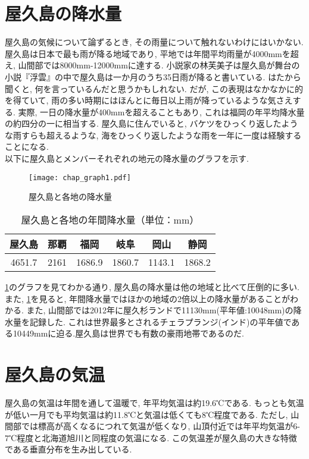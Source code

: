 \documentclass[10pt,titlepage,a5paper]{ltjsbook}
\begin{document}
  \section{屋久島の降水量}
    屋久島の気候について論ずるとき, その雨量について触れないわけにはいかない. 屋久島は日本で最も雨が降る地域であり, 平地では年間平均雨量が4000mmを超え, 山間部では8000mm-12000mmに達する.
    小説家の林芙美子は屋久島が舞台の小説『浮雲』の中で屋久島は一か月のうち35日雨が降ると書いている. はたから聞くと, 何を言っているんだと思うかもしれない. だが, この表現はなかなかに的を得ていて, 雨の多い時期にはほんとに毎日以上雨が降っているような気さえする. 
    実際, 一日の降水量が400mmを超えることもあり, これは福岡の年平均降水量の約四分の一に相当する. 屋久島に住んでいると, バケツをひっくり返したような雨すらも超えるような, 
    海をひっくり返したような雨を一年に一度は経験することになる. \\
    以下に屋久島とメンバーそれぞれの地元の降水量のグラフを示す.
    \begin{figure}[H]
      \centering
      \texttt{[image: chap\_graph1.pdf]}
      \caption{屋久島と各地の降水量}
      \label{fig:yakushima_precipitation}
    \end{figure}
    \vspace{-2em}
    \begin{table}[H]
      \centering
      \begin{tabular}{|c|c|c|c|c|c|}
         \hline
          屋久島 & 那覇 & 福岡 & 岐阜 & 岡山 & 静岡 \\
          \hline
          4651.7 & 2161 & 1686.9 & 1860.7 & 1143.1 & 1868.2 \\\hline
      \end{tabular}
      \caption{屋久島と各地の年間降水量（単位：mm）}
      \label{tab:yakushima_precipitation}
    \end{table}
    \cref{fig:yakushima_precipitation}のグラフを見てわかる通り, 屋久島の降水量は他の地域と比べて圧倒的に多い.
    また, \cref{tab:yakushima_precipitation}を見ると, 年間降水量ではほかの地域の2倍以上の降水量があることがわかる.
    また, 山間部では2012年に屋久杉ランドで11130mm(平年値:10048mm)の降水量を記録した. これは世界最多とされるチェラプランジ(インド)の平年値である10449mmに迫る.屋久島は世界でも有数の豪雨地帯であるのだ.
  \section{屋久島の気温}
    屋久島の気温は年間を通して温暖で, 年平均気温は約19.6℃である. もっとも気温が低い一月でも平均気温は約11.8℃と気温は低くても8℃程度である.
    ただし, 山間部では標高が高くなるにつれて気温が低くなり, 山頂付近では年平均気温が6-7℃程度と北海道旭川と同程度の気温になる.
    この気温差が屋久島の大きな特徴である垂直分布\footnotemark[5] を生み出している.
\end{document}
